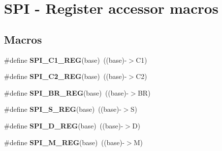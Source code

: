 \hypertarget{group___s_p_i___register___accessor___macros}{}\section{S\+PI -\/ Register accessor macros}
\label{group___s_p_i___register___accessor___macros}
\subsection*{Macros}
\begin{DoxyCompactItemize}
\item 
\mbox{\label{group___s_p_i___register___accessor___macros_gaab10c0d68bf4bf1d9906c39b1ed053b1}} 
\#define {\bfseries S\+P\+I\+\_\+\+C1\+\_\+\+R\+EG}(base)~((base)-\/$>$C1)
\item 
\mbox{\label{group___s_p_i___register___accessor___macros_ga74470421e50ddfa892f20557aac775a0}} 
\#define {\bfseries S\+P\+I\+\_\+\+C2\+\_\+\+R\+EG}(base)~((base)-\/$>$C2)
\item 
\mbox{\label{group___s_p_i___register___accessor___macros_ga6cf6551cb2fa5b60d6dfbe7544ef7ec7}} 
\#define {\bfseries S\+P\+I\+\_\+\+B\+R\+\_\+\+R\+EG}(base)~((base)-\/$>$BR)
\item 
\mbox{\label{group___s_p_i___register___accessor___macros_ga19d81f95fe621c7c2a42a6686131f9c2}} 
\#define {\bfseries S\+P\+I\+\_\+\+S\+\_\+\+R\+EG}(base)~((base)-\/$>$S)
\item 
\mbox{\label{group___s_p_i___register___accessor___macros_ga78694fa47ead59b8be3620b96600a223}} 
\#define {\bfseries S\+P\+I\+\_\+\+D\+\_\+\+R\+EG}(base)~((base)-\/$>$D)
\item 
\mbox{\label{group___s_p_i___register___accessor___macros_ga1647c87dc9d038f003a2c3456aa6c508}} 
\#define {\bfseries S\+P\+I\+\_\+\+M\+\_\+\+R\+EG}(base)~((base)-\/$>$M)
\item 
\mbox{\label{group___s_p_i___register___accessor___macros_ga2b777381f1ec71e064b9de35c6dd8dd1}} 

\end{DoxyCompactItemize}
